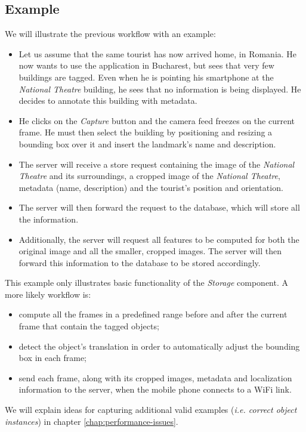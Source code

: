 \documentclass[a4paper,onecolumn,oneside,titlepage,11pt]{report}
\begin{document}
\subsection*{Example}
We will illustrate the previous workflow with an example:

\begin{itemize}
	\item Let us assume that the same tourist has now arrived home, in Romania. He now wants to use the application in Bucharest, but sees that very few buildings are tagged. Even when he is pointing his smartphone at the \emph{National Theatre} building, he sees that no information is being displayed. He decides to annotate this building with metadata.
	\item He clicks on the \emph{Capture} button and the camera feed freezes on the current frame. He must then select the building by positioning and resizing a bounding box over it and insert the landmark's name and description.
	\item The server will receive a store request containing the image of the \emph{National Theatre} and its surroundings, a cropped image of the \emph{National Theatre}, metadata (name, description) and the tourist's position and orientation. 
	\item The server will then forward the request to the database, which will store all the information.
	\item Additionally, the server will request all features to be computed for both the original image and all the smaller, cropped images. The server will then forward this information to the database to be stored accordingly.
\end{itemize}
This example only illustrates basic functionality of the \emph{Storage} component. A more likely workflow is:
\begin{itemize}
	\item compute all the frames in a predefined range before and after the current frame that contain the tagged objects;
	\item detect the object's translation in order to automatically adjust the bounding box in each frame;
	\item send each frame, along with its cropped images, metadata and localization information to the server, when the mobile phone connects to a WiFi link.
\end{itemize}
We will explain ideas for capturing additional valid examples (\emph{i.e. correct object instances}) in chapter \ref{chap:performance-issues}.
\end{document}
